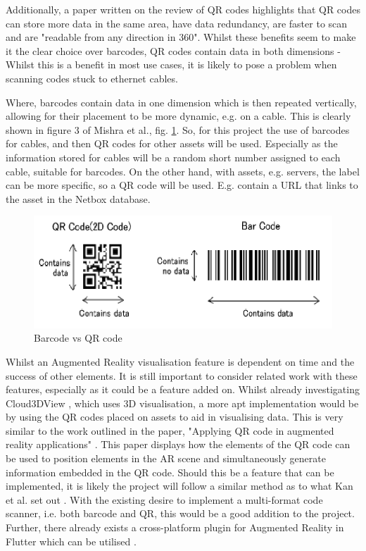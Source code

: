 \documentclass [11pt,a4paper]{article}
\begin{document}
Additionally, a paper written on the review of QR codes highlights that QR codes can store more data in the same area, have data redundancy, are faster to scan and are "readable from any direction in 360\degree"\cite{mishra2017review}.  Whilst these benefits seem to make it the clear choice over barcodes, QR codes contain data in both dimensions - Whilst this is a benefit in most use cases, it is likely to pose a problem when scanning codes stuck to ethernet cables.

Where, barcodes contain data in one dimension which is then repeated vertically, allowing for their placement to be more dynamic, e.g. on a cable. This is clearly shown in figure 3 of Mishra et al., fig. \ref{fig:barcode}. So, for this project the use of barcodes for cables, and then QR codes for other assets will be used. Especially as the information stored for cables will be a random short number assigned to each cable, suitable for barcodes. On the other hand, with assets, e.g. servers, the label can be more specific, so a QR code will be used. E.g. contain a URL that links to the asset in the Netbox database.

\begin{figure}[H]
\centering
\includegraphics[width=.75\textwidth]{images/barcode_mishra.png}
\caption{Barcode vs QR code}
\label{fig:barcode}
\end{figure}

Whilst an Augmented Reality visualisation feature is dependent on time and the success of other elements. It is still important to consider related work with these features, especially as it could be a feature added on. Whilst already investigating Cloud3DView \cite{cloud3dview}, which uses 3D visualisation, a more apt implementation would be by using the QR codes placed on assets to aid in visualising data. This is very similar to the work outlined in the paper, "Applying QR code in augmented reality applications" \cite{applyingQR}. This paper displays how the elements of the QR code can be used to position elements in the AR scene and simultaneously generate information embedded in the QR code. Should this be a feature that can be implemented, it is likely the project will follow a similar method as to what Kan et al. set out \cite{applyingQR}. With the existing desire to implement a multi-format code scanner, i.e. both barcode and QR, this would be a good addition to the project. Further, there already exists a cross-platform plugin for Augmented Reality in Flutter which can be utilised \cite{ar_flutter}.
\end{document}

